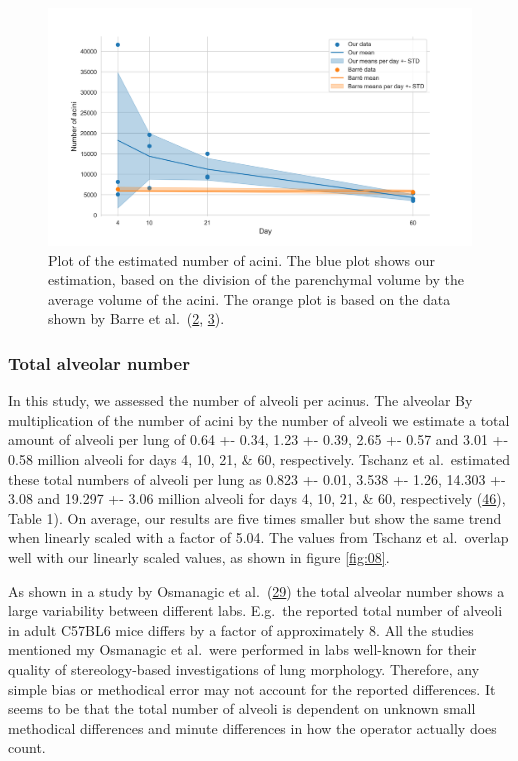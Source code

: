 \documentclass[
  american,
]{article}
\begin{document}
\begin{figure}
\hypertarget{fig:07}{%
\centering
\includegraphics{images/fig07.png}
\caption{Plot of the estimated number of acini.
The blue plot shows our estimation, based on the division of the parenchymal volume by the average volume of the acini.
The orange plot is based on the data shown by Barre et al.~(\protect\hyperlink{ref-14OP85b2F}{2}, \protect\hyperlink{ref-uFNlWogb}{3}).}\label{fig:07}
}
\end{figure}

\hypertarget{total-alveolar-number}{%
\subsubsection{Total alveolar number}\label{total-alveolar-number}}

In this study, we assessed the number of alveoli per acinus. The alveolar By multiplication of the number of acini by the number of alveoli we estimate a total amount of alveoli per lung of 0.64 +- 0.34, 1.23 +- 0.39, 2.65 +- 0.57 and 3.01 +- 0.58 million alveoli for days 4, 10, 21, \& 60, respectively.
Tschanz et al.~estimated these total numbers of alveoli per lung as 0.823 +- 0.01, 3.538 +- 1.26, 14.303 +- 3.08 and 19.297 +- 3.06 million alveoli for days 4, 10, 21, \& 60, respectively (\protect\hyperlink{ref-wnl86DEM}{46}), Table 1).
On average, our results are five times smaller but show the same trend when linearly scaled with a factor of 5.04.
The values from Tschanz et al.~overlap well with our linearly scaled values, as shown in figure \ref{fig:08}.

As shown in a study by Osmanagic et al.~(\protect\hyperlink{ref-LzalnLBH}{29}) the total alveolar number shows a large variability between different labs.
E.g.~the reported total number of alveoli in adult C57BL6 mice differs by a factor of approximately 8.
All the studies mentioned my Osmanagic et al.~were performed in labs well-known for their quality of stereology-based investigations of lung morphology.
Therefore, any simple bias or methodical error may not account for the reported differences.
It seems to be that the total number of alveoli is dependent on unknown small methodical differences and minute differences in how the operator actually does count.
\end{document}
